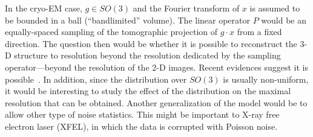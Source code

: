 \documentclass[english,12pt]{article}
\newcommand{\TODO}[1]{{\color{red}{[#1]}}}
\numberwithin{equation}{section}
\numberwithin{thm}{section} %
\begin{document}
In the cryo-EM case, $g\in SO(3)$ and the Fourier transform of $x$ is assumed to be bounded in a ball (``bandlimited'' volume). The linear operator $P$ would be an equally-spaced sampling of the tomographic projection of $g\cdot x$ from a fixed direction. The question then would be whether it is possible to reconstruct the 3-D structure to resolution beyond the resolution dedicated by the sampling operator---beyond the resolution of the 2-D images. Recent evidences suggest it is possible~\cite{chen2018single}. In addition, since the distribution over $SO(3)$ is usually non-uniform, it would be interesting to study the effect of the distribution on the maximal resolution that can be obtained. Another generalization of the model would be to allow other type of noise statistics. This might be important to X-ray free electron laser (XFEL), in which the data is corrupted with Poisson noise.
 
 \TODO{Relation to 2-D Kam's method?}
	




\appendix
\end{document}
